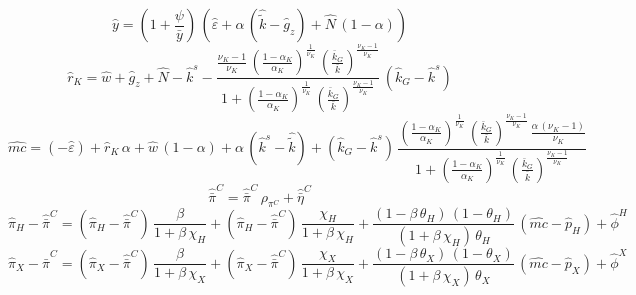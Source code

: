 \begin{dmath}
{\hat{y}}=\left(1+\frac{{\psi}}{{\bar{y}}}\right)\, \left({\hat{\varepsilon}}+{\alpha}\, \left({\hat{\tilde{k}}}-{{\hat{g}_z}}\right)+{\hat{N}}\, \left(1-{\alpha}\right)\right)
\end{dmath}
\begin{dmath}
{\hat{r}_K}={\hat{w}}+{{\hat{g}_z}}+{\hat{N}}-{\hat{k}^s}-\frac{\frac{{\nu_K}-1}{{\nu_K}}\, \left(\frac{1-{\alpha_K}}{{\alpha_K}}\right)^{\frac{1}{{\nu_K}}}\, \left(\frac{{\bar{k}_G}}{{\bar{k}}}\right)^{\frac{{\nu_K}-1}{{\nu_K}}}}{1+\left(\frac{1-{\alpha_K}}{{\alpha_K}}\right)^{\frac{1}{{\nu_K}}}\, \left(\frac{{\bar{k}_G}}{{\bar{k}}}\right)^{\frac{{\nu_K}-1}{{\nu_K}}}}\, \left({\hat{k}_G}-{\hat{k}^s}\right)
\end{dmath}
\begin{dmath}
{\hat{mc}}=\left(-{\hat{\varepsilon}}\right)+{\hat{r}_K}\, {\alpha}+{\hat{w}}\, \left(1-{\alpha}\right)+{\alpha}\, \left({\hat{k}^s}-{\hat{\tilde{k}}}\right)+\left({\hat{k}_G}-{\hat{k}^s}\right)\, \frac{\left(\frac{1-{\alpha_K}}{{\alpha_K}}\right)^{\frac{1}{{\nu_K}}}\, \left(\frac{{\bar{k}_G}}{{\bar{k}}}\right)^{\frac{{\nu_K}-1}{{\nu_K}}}\, \frac{{\alpha}\, \left({\nu_K}-1\right)}{{\nu_K}}}{1+\left(\frac{1-{\alpha_K}}{{\alpha_K}}\right)^{\frac{1}{{\nu_K}}}\, \left(\frac{{\bar{k}_G}}{{\bar{k}}}\right)^{\frac{{\nu_K}-1}{{\nu_K}}}}
\end{dmath}
\begin{dmath}
{\hat{\bar{\pi}}^C}={\hat{\bar{\pi}}^C}\, {\rho_{\pi^C}}+{\hat{\bar{\eta}}^C}
\end{dmath}
\begin{dmath}
{\hat{\pi}_{H}}-{\hat{\bar{\pi}}^C}=\left({\hat{\pi}_{H}}-{\hat{\bar{\pi}}^C}\right)\, \frac{{\beta}}{1+{\beta}\, {\chi_H}}+\left({\hat{\pi}_{H}}-{\hat{\bar{\pi}}^C}\right)\, \frac{{\chi_H}}{1+{\beta}\, {\chi_H}}+\frac{\left(1-{\beta}\, {\theta_H}\right)\, \left(1-{\theta_H}\right)}{\left(1+{\beta}\, {\chi_H}\right)\, {\theta_H}}\, \left({\hat{mc}}-{\hat{p}_H}\right)+{\hat{\phi}^H}
\end{dmath}
\begin{dmath}
{\hat{\pi}_{X}}-{\hat{\bar{\pi}}^C}=\left({\hat{\pi}_{X}}-{\hat{\bar{\pi}}^C}\right)\, \frac{{\beta}}{1+{\beta}\, {\chi_X}}+\left({\hat{\pi}_{X}}-{\hat{\bar{\pi}}^C}\right)\, \frac{{\chi_X}}{1+{\beta}\, {\chi_X}}+\frac{\left(1-{\beta}\, {\theta_X}\right)\, \left(1-{\theta_X}\right)}{\left(1+{\beta}\, {\chi_X}\right)\, {\theta_X}}\, \left({\hat{mc}}-{\hat{p}_X}\right)+{\hat{\phi}^X}
\end{dmath}
